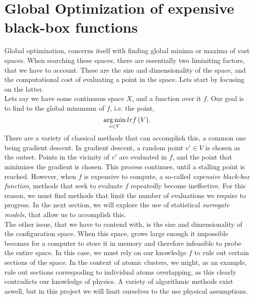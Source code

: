 \documentclass[working, oneside]{../../../Preambles/marginclass}
\begin{document}
\section{Global Optimization of expensive black-box functions}
Global optimization, concerns itself with finding global minima or maxima of vast spaces. When searching these spaces, there are essentially two liminiting factors, that we have to account. These are the size and dimensionality of the space, and the computational cost of evaluating a point in the space. Lets start by focusing on the latter. \\
Lets say we have some continuous space $X$, and a function over it $f$. Our goal is to find to the global minumum of $f$, i.e. the point,
 \[
     \operatorname*{arg\,min}_{v \in V} lr{f\left( V \right)} 
.\]
There are a variety of classical methods that can accomplish this, a common one being gradient descent. In gradient descent, a random point $v' \in V$ is chosen as the outset. Points in the vicinity of $v'$ are evaluated in $f$, and the point that minimizes the gradient is chosen. This process continues, until a stalling point is reached. However, when $f$ is expensive to compute, a so-called \textit{expensive black-box function}, methods that seek to evaluate $f$ repeatedly become ineffective. For this reason, we must find methods that limit the number of evaluations we require to progress. In the next section, we will explore the use of statistical \textit{surrogate models}, that allow us to accomplish this. 
\\
The other issue, that we have to contend with, is the size and dimensionality of the configuration space. When this space, grows large enough it impossible becomes for a computer to store it in memory and therefore infeasible to probe the entire space. In this case, we must rely on our knowledge $f$ to rule out certain sections of the space. In the context of atomic clusters, we might, as an example, rule out sections correspoding to individual atoms overlapping, as this clearly contradicts our knowledge of physics. A variety of algorithmic methods exist aswell, but in this project we will limit ourselves to the use physical assumptions.
\end{document}

